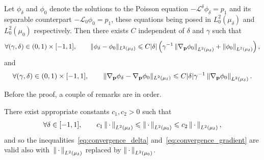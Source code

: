 \documentclass[11pt,a4paper]{article}
\begin{document}
\begin{proposition}
    \label{proposition:convergence_gradient}
    Let $\phi_{\delta}$ and $\phi_0$ denote the solutions to the Poisson equation $- \mathcal L^{\delta} \phi_{\delta} = p_1$
    and its separable counterpart $- \mathcal L_0 \phi_0 = p_1$,
    these equations being posed in $L^2_0(\mu_{\delta})$ and $L^2_0(\mu_0)$ respectively.
    Then there exists $C$ independent of $\delta$ and $\gamma$ such that
    \begin{align}
        \label{eq:convergence_delta}
        \forall (\gamma, \delta) \in (0, 1) \times [-1, 1], \qquad
        \norm*{\phi_\delta - \phi_0}[L^2(\mu_{\delta})]
        \leq C\lvert \delta \rvert \left(
              \gamma^{-1} \norm{\grad_{\vect p} \phi_0}[L^2(\mu_{\delta})]
            + \norm{\phi_0}[L^2(\mu_{\delta})]
        \right),
    \end{align}
    and
    \begin{align}
        \label{eq:convergence_gradient}
        \forall (\gamma, \delta) \in (0, 1) \times [-1, 1], \qquad
        \norm*{\grad_{\vect p} \phi_\delta - \grad_{\vect p} \phi_0}[L^2(\mu_{\delta})]
        \leq C \lvert \delta \rvert  \gamma^{-1} \norm{\grad_{\vect p} \phi_0}[L^2(\mu_{\delta})] .
    \end{align}
\end{proposition}
Before the proof, a couple of remarks are in order.
\begin{remark}
    There exist appropriate constants $c_1, c_2 > 0$ such that
    \[
        \forall \delta \in [-1, 1], \qquad
        c_1 \norm{\dummy}[L^2(\mu_{\delta})] \leq \norm{\dummy}[L^2(\mu_0)] \leq c_2 \norm{\dummy}[L^2(\mu_{\delta})],
    \]
    and so the inequalities~\eqref{eq:convergence_delta} and~\eqref{eq:convergence_gradient} are valid also with~$\norm{\dummy}[L^2(\mu_{\delta})]$ replaced by $\norm{\dummy}[L^2(\mu_{0})]$.
\end{remark}
\end{document}
